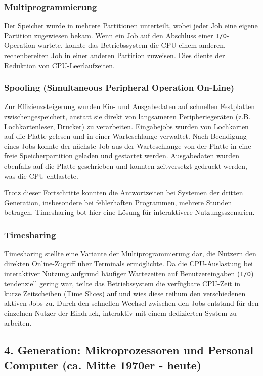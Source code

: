 \subsubsection*{Multiprogrammierung}
Der Speicher wurde in mehrere Partitionen unterteilt, wobei jeder Job eine eigene Partition zugewiesen bekam. Wenn ein Job auf den Abschluss einer \texttt{I/O}-Operation wartete, konnte das Betriebssystem die CPU einem anderen, rechenbereiten Job in einer anderen Partition zuweisen. Dies diente der Reduktion von CPU-Leerlaufzeiten.

\subsubsection*{Spooling (Simultaneous Peripheral Operation On-Line)}
Zur Effizienzsteigerung wurden Ein- und Ausgabedaten auf schnellen Festplatten zwischengespeichert, anstatt sie direkt von langsameren Peripheriegeräten (z.B. Lochkartenleser, Drucker) zu verarbeiten. Eingabejobs wurden von Lochkarten auf die Platte gelesen und in einer Warteschlange verwaltet. Nach Beendigung eines Jobs konnte der nächste Job aus der Warteschlange von der Platte in eine freie Speicherpartition geladen und gestartet werden. Ausgabedaten wurden ebenfalls auf die Platte geschrieben und konnten zeitversetzt gedruckt werden, was die CPU entlastete.

Trotz dieser Fortschritte konnten die Antwortzeiten bei Systemen der dritten
Generation, insbesondere bei fehlerhaften Programmen, mehrere Stunden betragen.
Timesharing bot hier eine Lösung für interaktivere Nutzungsszenarien.

\subsubsection*{Timesharing}
Timesharing stellte eine Variante der Multiprogrammierung dar, die Nutzern den direkten Online-Zugriff über Terminals ermöglichte. Da die CPU-Auslastung bei interaktiver Nutzung aufgrund häufiger Wartezeiten auf Benutzereingaben (\texttt{I/O}) tendenziell gering war, teilte das Betriebssystem die verfügbare CPU-Zeit in kurze Zeitscheiben (Time Slices) auf und wies diese reihum den verschiedenen aktiven Jobs zu. Durch den schnellen Wechsel zwischen den Jobs entstand für den einzelnen Nutzer der Eindruck, interaktiv mit einem dedizierten System zu arbeiten.

\subsection{4. Generation: Mikroprozessoren und Personal Computer (ca. Mitte 1970er - heute)}

